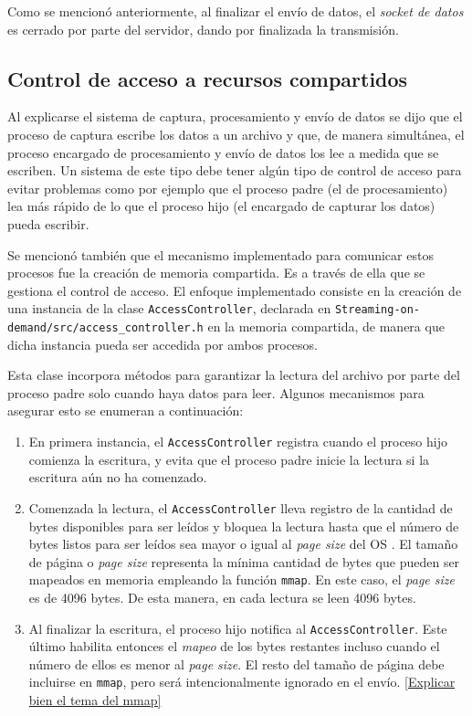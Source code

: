 \documentclass[../../main.tex]{subfiles}
\begin{document}
Como se mencionó anteriormente, al finalizar el envío de datos, el \textit{socket de datos} es cerrado por parte del servidor, dando por finalizada la transmisión.

\subsection{Control de acceso a recursos compartidos}
Al explicarse el sistema de captura, procesamiento y envío de datos se dijo que el proceso de captura escribe los datos a un archivo y que, de manera simultánea, el proceso encargado de procesamiento y envío de datos los lee a medida que se escriben. Un sistema de este tipo debe tener algún tipo de control de acceso para evitar problemas como por ejemplo que el proceso padre (el de procesamiento) lea más rápido de lo que el proceso hijo (el encargado de capturar los datos) pueda escribir.

Se mencionó también que el mecanismo implementado para comunicar estos procesos fue la creación de memoria compartida. Es a través de ella que se gestiona el control de acceso. El enfoque implementado consiste en la creación de una instancia de la clase \texttt{AccessController}, declarada en \texttt{Streaming-on-demand/src/access\_controller.h} en la memoria compartida, de manera que dicha instancia pueda ser accedida por ambos procesos.

Esta clase incorpora métodos para garantizar la lectura del archivo por parte del proceso padre solo cuando haya datos para leer. Algunos mecanismos para asegurar esto se enumeran a continuación:
\begin{enumerate}
    \item En primera instancia, el \texttt{AccessController} registra cuando el proceso hijo comienza la escritura, y evita que el proceso padre inicie la lectura si la escritura aún no ha comenzado.
    \item Comenzada la lectura, el \texttt{AccessController} lleva registro de la cantidad de bytes disponibles para ser leídos y bloquea la lectura hasta que el número de bytes listos para ser leídos sea mayor o igual al \textit{page size} del OS . El tamaño de página o \textit{page size} representa la mínima cantidad de bytes que pueden ser mapeados en memoria empleando la función \texttt{mmap}. En este caso, el \textit{page size} es de 4096 bytes. De esta manera, en cada lectura se leen 4096 bytes.
    \item Al finalizar la escritura, el proceso hijo notifica al \texttt{AccessController}. Este último habilita entonces el \textit{mapeo} de los bytes restantes incluso cuando el número de ellos es menor al \textit{page size}. El resto del tamaño de página debe incluirse en \texttt{mmap}, pero será intencionalmente ignorado en el envío. \ref{Explicar bien el tema del mmap}
\end{enumerate}
\end{document}
